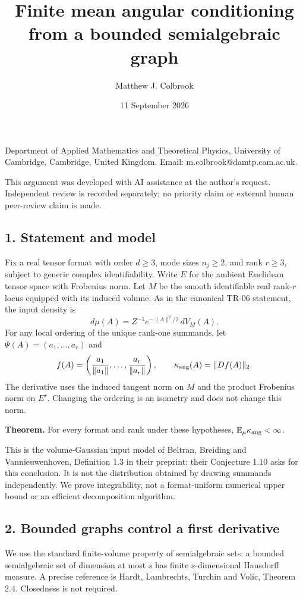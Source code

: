 \documentclass[
  11pt,
]{article}
\title{Finite mean angular conditioning from a bounded semialgebraic
graph}
\author{Matthew J. Colbrook}
\date{11 September 2026}
\begin{document}
\maketitle

Department of Applied Mathematics and Theoretical Physics, University of
Cambridge, Cambridge, United Kingdom. Email: m.colbrook@damtp.cam.ac.uk.

This argument was developed with AI assistance at the author's request.
Independent review is recorded separately; no priority claim or external
human peer-review claim is made.

\subsection{1. Statement and model}\label{statement-and-model}

Fix a real tensor format with order \(d\ge3\), mode sizes \(n_j\ge2\),
and rank \(r\ge3\), subject to generic complex identifiability. Write
\(E\) for the ambient Euclidean tensor space with Frobenius norm. Let
\(M\) be the smooth identifiable real rank-\(r\) locus equipped with its
induced volume. As in the canonical TR-06 statement, the input density
is \[
d\mu(A)=Z^{-1}e^{-\|A\|^2/2}\,dV_M(A).
\] For any local ordering of the unique rank-one summands, let
\(\Psi(A)=(a_1,\ldots,a_r)\) and \[
f(A)=\left(\frac{a_1}{\|a_1\|},\ldots,\frac{a_r}{\|a_r\|}\right),
\qquad \kappa_{\rm ang}(A)=\|Df(A)\|_2.
\] The derivative uses the induced tangent norm on \(M\) and the product
Frobenius norm on \(E^r\). Changing the ordering is an isometry and does
not change this norm.

\textbf{Theorem.} For every format and rank under these hypotheses,
\(\mathbb E_\mu\kappa_{\rm ang}<\infty\).

This is the volume-Gaussian input model of Beltran, Breiding and
Vannieuwenhoven, Definition 1.3 in their preprint; their Conjecture 1.10
asks for this conclusion. It is not the distribution obtained by drawing
summands independently. We prove integrability, not a format-uniform
numerical upper bound or an efficient decomposition algorithm.

\subsection{2. Bounded graphs control a first
derivative}\label{bounded-graphs-control-a-first-derivative}

We use the standard finite-volume property of semialgebraic sets: a
bounded semialgebraic set of dimension at most \(s\) has finite
\(s\)-dimensional Hausdorff measure. A precise reference is Hardt,
Lambrechts, Turchin and Volic, Theorem 2.4. Closedness is not required.
\end{document}
